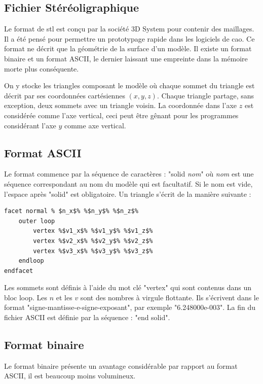 \subsection{Fichier Stéréoligraphique}

Le format de \gls{stl} est conçu par la société 3D System pour contenir des maillages.
Il a été pensé pour permettre un prototypage rapide dans les logiciels de \gls{cao}. 
Ce format ne décrit que la géométrie de la surface d'un modèle.
Il existe un format binaire et un format ASCII, le dernier laissant une empreinte dans la mémoire morte plus conséquente.

On y stocke les triangles composant le modèle où chaque sommet du triangle est décrit par ses coordonnées cartésiennes $(x,y,z)$. Chaque triangle partage, sans exception, deux sommets avec un triangle voisin.
La coordonnée dans l'axe $z$ est considérée comme l'axe vertical, ceci peut être gênant pour les programmes considérant l'axe $y$ comme axe vertical.

\subsection{Format ASCII}

Le format commence par la séquence de caractères : "solid \textit{nom}" où \textit{nom} est une séquence correspondant au nom du modèle qui est facultatif.
Si le nom est vide, l'espace après "solid" est obligatoire.
Un triangle s'écrit de la manière suivante :
\begin{minipage}{\linewidth}
\begin{lstlisting}[frame=single, escapechar=\%]
facet normal % $n_x$% %$n_y$% %$n_z$%
    outer loop
        vertex %$v1_x$% %$v1_y$% %$v1_z$%
        vertex %$v2_x$% %$v2_y$% %$v2_z$%
        vertex %$v3_x$% %$v3_y$% %$v3_z$%
    endloop
endfacet
\end{lstlisting}
\end{minipage}
Les sommets sont définis à l'aide du mot clé "vertex" qui sont contenus dans un bloc loop. Les $n$ et les $v$ sont des nombres à virgule flottante.
Ils s'écrivent dans le format "signe-mantisse-e-signe-exposant", par exemple "6.248000e-003".
La fin du fichier ASCII est définie par la séquence : "end solid".

\subsection{Format binaire}

Le format binaire présente un avantage considérable par rapport au format ASCII, il est beaucoup moins volumineux. 

